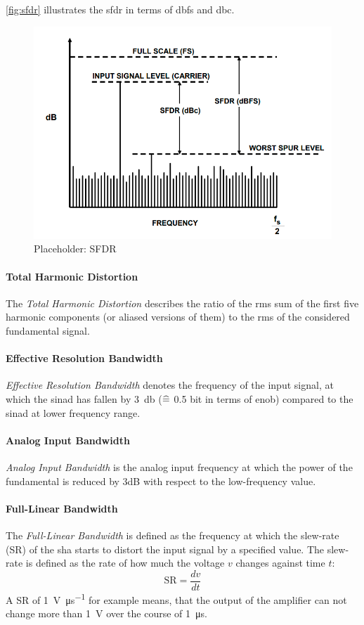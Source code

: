 \autoref{fig:sfdr} illustrates the \gls{sfdr} in terms of \gls{dbfs} and \gls{dbc}.

\begin{figure}[tbh]
	\centering
	\includegraphics[width = \textwidth]{chap/02-theory/img/sfdr}
	\caption{Placeholder: SFDR \cite{walt2009}}
	\label{fig:sfdr}
\end{figure}
\paragraph{Total Harmonic Distortion}
The \textit{Total Harmonic Distortion} describes the ratio of the \gls{rms} sum of the first five harmonic components (or aliased versions of them) to the \gls{rms} of the considered fundamental signal.  \cite{Lundberg}
\paragraph{Effective Resolution Bandwidth}
\textit{Effective Resolution Bandwidth} denotes the frequency of the input signal, at which the \gls{sinad} has fallen by \SI{3}{\decibel} ($\mathrel{\widehat{=}}$ 0.5 bit in terms of \gls{enob}) compared to the \gls{sinad} at lower frequency range. \cite{Lundberg}
\paragraph{Analog Input Bandwidth}
\textit{Analog Input Bandwidth} is the analog input frequency at which the power of the fundamental is reduced by 3dB with respect to the low-frequency value.
\paragraph{Full-Linear Bandwidth}
The \textit{Full-Linear Bandwidth} is defined as the frequency at which the slew-rate (SR) of the \gls{sha} starts to distort the input signal by a specified value. \cite{Lundberg} The slew-rate is defined as the rate of how much the voltage $v$ changes against time $t$:
\begin{equation}
	\text{SR} = \frac{dv}{dt}
\end{equation}
A SR of \SI{1}{\volt \per \micro \second} for example means, that the output of the amplifier can not change more than \SI{1}{\volt} over the course of \SI{1}{\micro \second}.\cite{2021Slew} 
